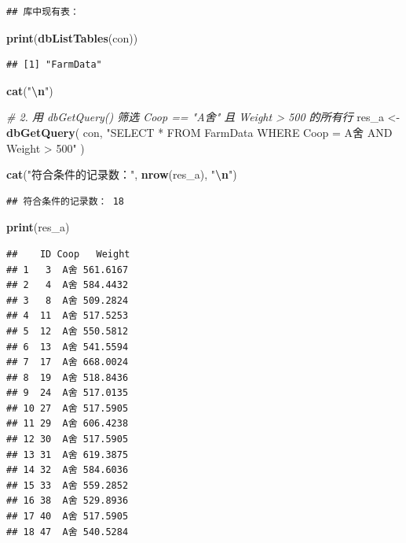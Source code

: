 \documentclass[
]{ctexart}
\newenvironment{Shaded}{\begin{snugshade}}{\end{snugshade}}
\newcommand{\CommentTok}[1]{\textcolor[rgb]{0.56,0.35,0.01}{\textit{#1}}}
\newcommand{\FunctionTok}[1]{\textcolor[rgb]{0.13,0.29,0.53}{\textbf{#1}}}
\newcommand{\NormalTok}[1]{#1}
\newcommand{\OtherTok}[1]{\textcolor[rgb]{0.56,0.35,0.01}{#1}}
\newcommand{\SpecialCharTok}[1]{\textcolor[rgb]{0.81,0.36,0.00}{\textbf{#1}}}
\newcommand{\StringTok}[1]{\textcolor[rgb]{0.31,0.60,0.02}{#1}}
\begin{document}
\begin{verbatim}
## 库中现有表：
\end{verbatim}

\begin{Shaded}
\begin{Highlighting}[]
\FunctionTok{print}\NormalTok{(}\FunctionTok{dbListTables}\NormalTok{(con))}
\end{Highlighting}
\end{Shaded}

\begin{verbatim}
## [1] "FarmData"
\end{verbatim}

\begin{Shaded}
\begin{Highlighting}[]
\FunctionTok{cat}\NormalTok{(}\StringTok{"}\SpecialCharTok{\textbackslash{}n}\StringTok{"}\NormalTok{)}
\end{Highlighting}
\end{Shaded}

\begin{Shaded}
\begin{Highlighting}[]
\CommentTok{\# 2. 用 dbGetQuery() 筛选 Coop == "A舍" 且 Weight \textgreater{} 500 的所有行}
\NormalTok{res\_a }\OtherTok{\textless{}{-}} \FunctionTok{dbGetQuery}\NormalTok{(}
\NormalTok{  con,}
  \StringTok{"SELECT * FROM FarmData WHERE Coop = \textquotesingle{}A舍\textquotesingle{} AND Weight \textgreater{} 500"}
\NormalTok{)}

\FunctionTok{cat}\NormalTok{(}\StringTok{"符合条件的记录数："}\NormalTok{, }\FunctionTok{nrow}\NormalTok{(res\_a), }\StringTok{"}\SpecialCharTok{\textbackslash{}n}\StringTok{"}\NormalTok{)}
\end{Highlighting}
\end{Shaded}

\begin{verbatim}
## 符合条件的记录数： 18
\end{verbatim}

\begin{Shaded}
\begin{Highlighting}[]
\FunctionTok{print}\NormalTok{(res\_a)}
\end{Highlighting}
\end{Shaded}

\begin{verbatim}
##    ID Coop   Weight
## 1   3  A舍 561.6167
## 2   4  A舍 584.4432
## 3   8  A舍 509.2824
## 4  11  A舍 517.5253
## 5  12  A舍 550.5812
## 6  13  A舍 541.5594
## 7  17  A舍 668.0024
## 8  19  A舍 518.8436
## 9  24  A舍 517.0135
## 10 27  A舍 517.5905
## 11 29  A舍 606.4238
## 12 30  A舍 517.5905
## 13 31  A舍 619.3875
## 14 32  A舍 584.6036
## 15 33  A舍 559.2852
## 16 38  A舍 529.8936
## 17 40  A舍 517.5905
## 18 47  A舍 540.5284
\end{verbatim}
\end{document}
